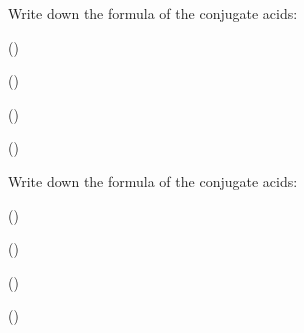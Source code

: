 \documentclass[main.tex]{subfiles}
\begin{document}
\begin{multicols*}{2}
\begin{question}[ID=\the\value{numA}]
Write down the formula of the conjugate acids:
\begin{inparaenum}[(a)]
\item  {} %
 \item  {} %
 \item  {} %
 \item  {} %
 \end{inparaenum}
\end{question}
\begin{solution}
\begin{inparaenum}[(a)]
 \item  {}  ()
 \item  {}  ()
 \item  {}  ()
 \item  {}  ()
 \end{inparaenum}
\hspace{0.1cm}\end{solution}%


\begin{question}[ID=\the\value{numA}]
Write down the formula of the conjugate acids:
\begin{inparaenum}[(a)]
\item  {} %
 \item  {} %
 \item  {} %
 \item  {} %
 \end{inparaenum}
\end{question}
\begin{solution}
\begin{inparaenum}[(a)]
 \item  {}  ()
 \item  {}  ()
 \item  {}  ()
 \item  {}  ()
 \end{inparaenum}
\hspace{0.1cm}\end{solution}%



\end{multicols*}
\end{document}
